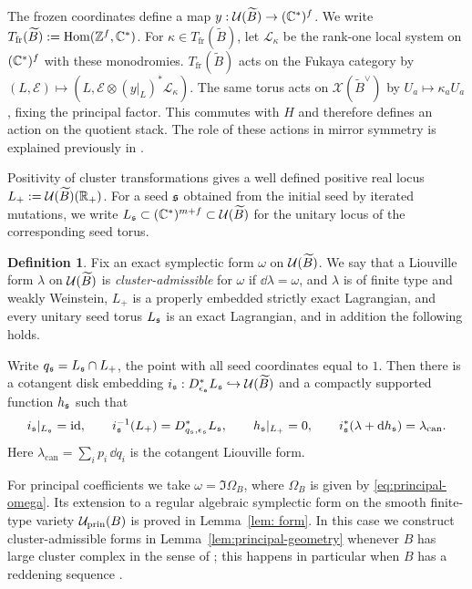 \documentclass[12pt, letter]{amsart}
\theoremstyle{definition}
\newtheorem{definition}[theorem]{Definition}
\newcommand{\Z}{\mathbb Z}
\newcommand{\pr}{\mathrm{prin}}
\newcommand{\fr}{\mathrm{fr}}
\numberwithin{equation}{section}
\begin{document}
The frozen coordinates define a map
$y:\mathcal U(\widetilde B)\to(\mathbb C^*)^f$. We write
$
 T_{\fr}(\widetilde B):=\operatorname{Hom}(\Z^f,\C^*)$.
For $\kappa\in T_{\fr}(\widetilde B)$, let $\mathcal L_\kappa$
be the rank-one local system on $(\mathbb C^*)^f$ with these monodromies.  
$T_{\fr}(\widetilde B)$ acts on the Fukaya category by
$(L,\mathcal E)\longmapsto
 (L,\mathcal E\otimes(y|_L)^*\mathcal L_\kappa)$.  The same torus acts on $\mathcal{X}(\widetilde B^\vee)$
by $U_a\mapsto\kappa_aU_a$, fixing the principal factor. This
commutes with $H$ and therefore defines an action on the quotient
stack.  The role of these actions in mirror symmetry is explained previously in \cite{GHK, GHKK, GS}. 



Positivity of cluster transformations gives a well defined positive real locus $L_+ := \mathcal{U}(\widetilde B)(\mathbb{R}_+)$.  For a seed $\mathfrak{s}$ obtained from the initial seed by iterated mutations, we write $L_{\mathfrak{s}} \subset (\mathbb C^*)^{m+f} \subset \mathcal{U}(\widetilde B)$ for the unitary locus of the corresponding seed torus.

\begin{definition}
Fix an exact symplectic form $\omega$ on $\mathcal{U}(\widetilde B)$.
We say that a Liouville form $\lambda$ on $\mathcal{U}(\widetilde B)$ is
\emph{cluster-admissible} for $\omega$ if
$\dd\lambda=\omega$, and $\lambda$ is of finite type and weakly Weinstein, $L_+$ is a properly
embedded strictly exact Lagrangian, and every unitary seed torus $L_{\mathfrak{s}}$
is an exact Lagrangian, and in addition the following holds. 

Write $q_{\mathfrak{s}}=L_{\mathfrak{s}}\cap L_+$, the point with all seed coordinates equal to $1$.
Then there is a cotangent disk embedding $i_{\mathfrak{s}}:D^*_{\epsilon_{\mathfrak{s}}}L_{\mathfrak{s}}\hookrightarrow
\mathcal{U}(\widetilde B)$ and a compactly supported function $h_{\mathfrak{s}}$ such that
\[
 i_{\mathfrak{s}}|_{L_{\mathfrak{s}}}=\mathrm{id},\qquad
 i_{\mathfrak{s}}^{-1}(L_+)=D^*_{q_{\mathfrak{s}},\epsilon_{\mathfrak{s}}}L_{\mathfrak{s}},\qquad
 h_{\mathfrak{s}}|_{L_+}=0,\qquad
 i_{\mathfrak{s}}^*(\lambda+\mathrm{d} h_{\mathfrak{s}})=\lambda_{\mathrm{can}}.
\]
Here $\lambda_{\mathrm{can}}=\sum_i p_i\,\dd q_i$ is the cotangent Liouville form.
\end{definition}

For principal coefficients we take $\omega=\Im\Omega_B$, where
$\Omega_B$ is given by \eqref{eq:principal-omega}.
Its extension to a regular algebraic symplectic form on the smooth
finite-type variety $\cU_{\pr}(B)$ is proved in Lemma~\ref{lem: form}.  In this case we construct cluster-admissible forms in Lemma~\ref{lem:principal-geometry} whenever $B$ has large cluster complex 
in the sense of \cite{GHKK}; this happens in particular when $B$ has a reddening sequence 
\cite[Lemma~8.29]{GHKK}.
\end{document}
